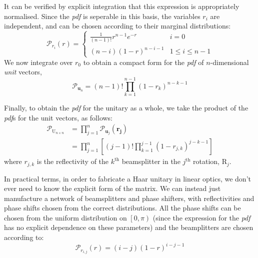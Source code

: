 \documentclass[aps,prl,twocolumn,floatfix]{revtex4}
\renewcommand{\vec}[1]{\mathbf{#1}}
\newcommand{\mat}[1]{\mathrm{#1}}
\newcommand{\by}{\times}
\newcommand{\of}[1]{\!\left(#1\right)}
\newcommand{\pdf}{{\it pdf}}
\newcommand{\prob}[1]{\mathcal{#1}}
\begin{document}
It can be verified by explicit integration that this expression is appropriately
normalised. Since the \pdf{} is seperable in this basis, the variables \( r_i
\) are independent, and can be chosen according to their marginal distributions:
\begin{equation}
  \prob{P}_{r_i} \of{ r } = \left\{ \begin{matrix}
    \frac{1}{ \left( n-1 \right)! } r^{n-1} e^{-r} & i=0 \\
    \left( n-i \right) \left( 1-r \right)^{n-i-1} & 1 \leq i \leq n-1
  \end{matrix} \right.
\end{equation}
We now integrate over \(r_{0}\) to obtain a compact form for the \pdf{} of
\(n\)-dimensional \emph{unit} vectors,
\begin{equation}
  \prob{P}_{ \vec{u}_n } = \left( n-1 \right)! \prod_{k=1}^{n-1} \left( 1-r_k
  \right)^{n-k-1}
\end{equation}

Finally, to obtain the \pdf{} for the unitary as a whole, we take the product
of the \pdf{}s for the unit vectors, as follows:
\begin{align*}
  \prob{P}_{\mat{U}_{n \by n}} &= \prod_{j=1}^{n} \prob{P}_{\vec{u}_j}
  \of{\vec{r_j}} \\
  &= \prod_{j=1}^{n} \left[ \left( j-1 \right)! \prod_{k=1}^{j-1} \left(
  1-r_{j,k} \right)^{j-k-1} \right]
\end{align*}
where \( r_{j,k} \) is the reflectivity of the \( k^{\text{th}} \) beamsplitter
in the \( j^{\text{th}} \) rotation, \( \mat{R}_j \).

In practical terms, in order to fabricate a Haar unitary in linear optics, we
don't ever need to know the explicit form of the matrix. We can instead just
manufacture a network of beamsplitters and phase shifters, with reflectivities
and phase shifts chosen from the correct distributions. All the phase shifts can
be chosen from the uniform distribution on \( \left[ 0,\pi \right) \) (since the
expression for the \pdf{} has no explicit dependence on these parameters) and
the beamplitters are chosen according to:
\begin{equation}
  \prob{P}_{r_{i,j}}\of{r} = \left( i-j \right) \left( 1-r \right)^{i-j-1}
\end{equation}
\end{document}
